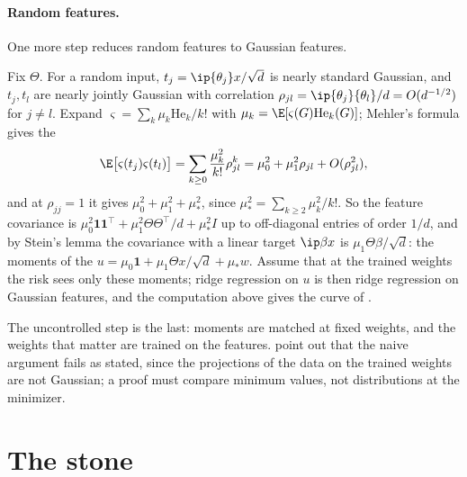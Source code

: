 \begin{refsection}
\paragraph{Random features.} One more step reduces random features to Gaussian features.

\begin{heuristic}
Fix $\Theta$. For a random input, $t_j=\ip{\theta_j}x/\sqrt d$ is nearly standard Gaussian, and $t_j,t_l$ are nearly jointly Gaussian with correlation $\rho_{jl}=\ip{\theta_j}{\theta_l}/d=O(d^{-1/2})$ for $j\ne l$. Expand $\varsigma=\sum_k\mu_k\mathrm{He}_k/k!$ with $\mu_k=\E[\varsigma(G)\mathrm{He}_k(G)]$; Mehler's formula gives the 
\[
\E\bigl[\varsigma(t_j)\varsigma(t_l)\bigr]=\sum_{k\ge0}\frac{\mu_k^2}{k!}\rho_{jl}^k=\mu_0^2+\mu_1^2\rho_{jl}+O(\rho_{jl}^2),
\]
and at $\rho_{jj}=1$ it gives $\mu_0^2+\mu_1^2+\mu_*^2$, since $\mu_*^2=\sum_{k\ge2}\mu_k^2/k!$. So the feature covariance is $\mu_0^2\mathbf1\mathbf1^\top+\mu_1^2\Theta\Theta^\top/d+\mu_*^2I$ up to off-diagonal entries of order $1/d$, and by Stein's lemma the covariance with a linear target $\ip\beta x$ is $\mu_1\Theta\beta/\sqrt d$: the moments of the  $u=\mu_0\mathbf1+\mu_1\Theta x/\sqrt d+\mu_*w$. Assume that at the trained weights the risk sees only these moments; ridge regression on $u$ is then ridge regression on Gaussian features, and the computation above gives the curve of \textcite{MeiMontanari2022}.
\end{heuristic}

The uncontrolled step is the last: moments are matched at fixed weights, and the weights that matter are trained on the features. \Textcite{MontanariSaeed2022} point out that the naive argument fails as stated, since the projections of the data on the trained weights are not Gaussian; a proof must compare minimum values, not distributions at the minimizer.

\section{The stone}\label{sec:kernels:stone}


\end{refsection}
